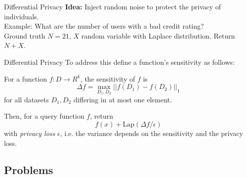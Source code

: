 \documentclass[aspectratio=43]{beamer}
\begin{document}

\begin{frame}{Differential Privacy}
    \textbf{Idea:} Inject random noise to protect the privacy of individuals.\\
    \bigskip
    Example: What are the number of users with a bad credit rating?\\
    \bigskip
    Ground truth $N=21$, $X$ random variable with Laplace distribution. Return $N+X$.\\
\end{frame}


\begin{frame}{Differential Privacy}
    To address this define a function's sensitivity as follows:
    \bigskip
    \begin{definition}
        For a function $f: D \rightarrow R^k$, the sensitivity of $f$ is
        $$
        \Delta f = \max_{D_1,D_2} || f(D_1) - f(D_2) ||_1
        $$
        for all datasets $D_1, D_2$ differing in at most one element.
    \end{definition}
    \bigskip 
    Then, for a query function $f$, return
    $$
    f(x) + \mathrm{Lap}(\Delta f / \epsilon)
    $$
    with \emph{privacy loss} $\epsilon$, i.e. the variance depends on the sensitivity and the privacy loss.
\end{frame}



\subsection{Problems}
\end{document}
